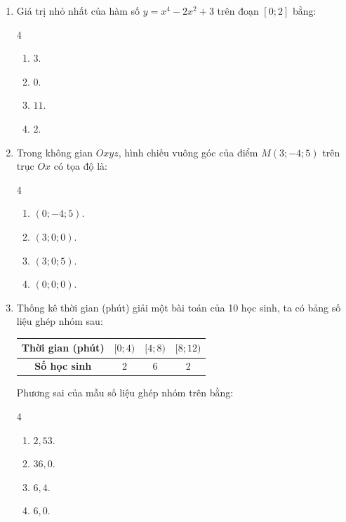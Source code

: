 \documentclass[12pt]{article}
\begin{document}
\begin{enumerate}[label=\textbf{Câu \arabic*.}, leftmargin=*]
		\item Giá trị nhỏ nhất của hàm số $y = x^4 - 2x^2 + 3$ trên đoạn $[0; 2]$ bằng:
		\begin{multicols}{4}
			\begin{enumerate}[label=\Alph*.]
				\item $3$.
				\item $0$.
				\item $11$.
				\item $2$.
			\end{enumerate}
		\end{multicols}
		
		\item Trong không gian $Oxyz$, hình chiếu vuông góc của điểm $M(3; -4; 5)$ trên trục $Ox$ có tọa độ là:
		\begin{multicols}{4}
			\begin{enumerate}[label=\Alph*.]
				\item $(0; -4; 5)$.
				\item $(3; 0; 0)$.
				\item $(3; 0; 5)$.
				\item $(0; 0; 0)$.
			\end{enumerate}
		\end{multicols}
		
		\item Thống kê thời gian (phút) giải một bài toán của 10 học sinh, ta có bảng số liệu ghép nhóm sau:
		\begin{center}
			\renewcommand{\arraystretch}{1.2}
			\begin{tabular}{|c|c|c|c|}
				\hline
				\textbf{Thời gian (phút)} & $[0; 4)$ & $[4; 8)$ & $[8; 12)$ \\
				\hline
				\textbf{Số học sinh} & 2 & 6 & 2 \\
				\hline
			\end{tabular}
		\end{center}
		Phương sai của mẫu số liệu ghép nhóm trên bằng:
		\begin{multicols}{4}
			\begin{enumerate}[label=\Alph*.]
				\item $2{,}53$.
				\item $36{,}0$.
				\item $6{,}4$.
				\item $6{,}0$.
			\end{enumerate}
		\end{multicols}
		

\end{enumerate}
\end{document}

